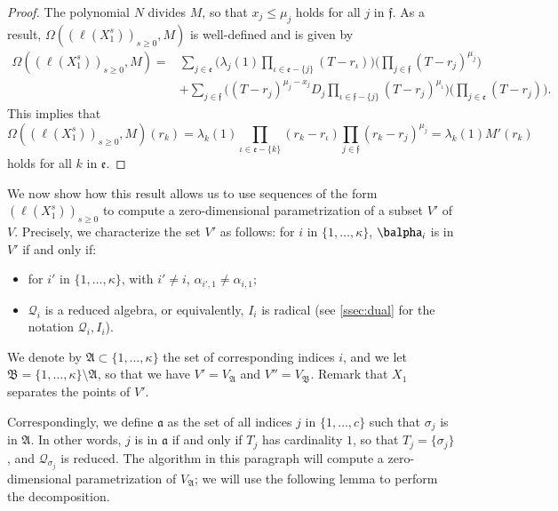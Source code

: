 \documentclass[final,1p,times,authoryear]{elsarticle}
\newcommand{\residueI}{\mathscr{Q}}
\def\dg{\kappa}
\begin{document}
\begin{proof}

  The polynomial $N$ divides $M$, so that $x_j \le \mu_j$ holds for all $j$
  in $\mathfrak{f}$.  As a result,
  $\Omega((\ell(X_1^s))_{s\ge0},M)$ is well-defined and is given by
  \begin{align*}
    \Omega((\ell(X_1^s))_{s\ge0},M)=&
    \sum_{j \in \mathfrak{e}}
    \Big(
    \lambda_j(1) \prod_{\iota \in \mathfrak{e}-\{j\}}(T-r_\iota)\Big)
    \Big(\prod_{j \in \mathfrak{f}}(T-r_j)^{\mu_j} \Big)\\
                                    &+
                                    \sum_{j\in \mathfrak{f}}
                                    \Big(  (T-r_j)^{\mu_j-x_j} D_j
                                    \prod_{\iota \in \mathfrak{f}-\{j\}}(T-r_j)^{\mu_\iota}\Big)
                                    \Big(\prod_{j\in \mathfrak{e}} (T-r_j) \Big).
  \end{align*}
  This implies that $$\Omega((\ell(X_1^s))_{s\ge0},M)(r_k) =\lambda_k(1) 
  \prod_{\iota \in \mathfrak{e}-\{k\}}(r_k-r_\iota)
  \prod_{j \in \mathfrak{f}}(r_k-r_j)^{\mu_j} = \lambda_k(1) M'(r_k)$$ 
  holds for all $k$ in $\mathfrak{e}$.
\end{proof}

We now show how this result allows us to use sequences of the form
$(\ell(X_1^s))_{s \ge 0}$ to compute a zero-dimensional
parametrization of a subset $V'$ of $V$. Precisely, we characterize
the set $V'$ as follows: for $i$ in $\{1,\dots,\dg\}$, $\balpha_i$ is
in $V'$ if and only if:
\begin{itemize}
  \item for $i'$ in $\{1,\dots,\dg\}$, with $i'\ne i$, $\alpha_{i',1} \ne
    \alpha_{i,1}$;
  \item $\residueI_i$ is a reduced algebra, or equivalently, $I_i$ is radical (see \cref{ssec:dual} 
    for the notation $\residueI_i,I_i$).
\end{itemize}
We denote by $\mathfrak{A}\subset \{1,\dots,\dg\}$ the set of
corresponding indices $i$, and we let
$\mathfrak{B}=\{1,\dots,\dg\}\setminus\mathfrak{A}$, so that we have
$V'=V_{\mathfrak{A}}$ and $V''=V_{\mathfrak{B}}$.  Remark that $X_1$
separates the points of $V'$.

Correspondingly, we define $\mathfrak{a}$ as the set of all indices
$j$ in $\{1,\dots,c\}$ such that $\sigma_j$ is in $\mathfrak{A}$. In
other words, $j$ is in $\mathfrak{a}$ if and only if $T_j$ has
cardinality $1$, so that $T_j=\{\sigma_j\}$, and
$\residueI_{\sigma_j}$ is reduced.  The algorithm in this paragraph
will compute a zero-dimensional parametrization of $V_{\mathfrak{A}}$;
we will use the following lemma to perform the decomposition.
\end{document}
